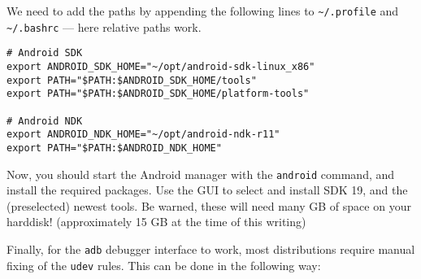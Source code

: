 We need to add the paths by appending the following lines to \texttt{\textasciitilde/.profile} and \texttt{\textasciitilde/.bashrc} --- here relative paths work.

\begin{verbatim}
# Android SDK
export ANDROID_SDK_HOME="~/opt/android-sdk-linux_x86"
export PATH="$PATH:$ANDROID_SDK_HOME/tools"
export PATH="$PATH:$ANDROID_SDK_HOME/platform-tools"

# Android NDK
export ANDROID_NDK_HOME="~/opt/android-ndk-r11"
export PATH="$PATH:$ANDROID_NDK_HOME"
\end{verbatim}

Now, you should start the Android manager with the \texttt{android} command, and install the required packages. Use the GUI to select and install SDK 19, and the (preselected) newest tools. Be warned, these will need many GB of space on your harddisk! (approximately 15 GB at the time of this writing)

Finally, for the \texttt{adb} debugger interface to work, most distributions require manual fixing of the \texttt{udev} rules. This can be done in the following way:

